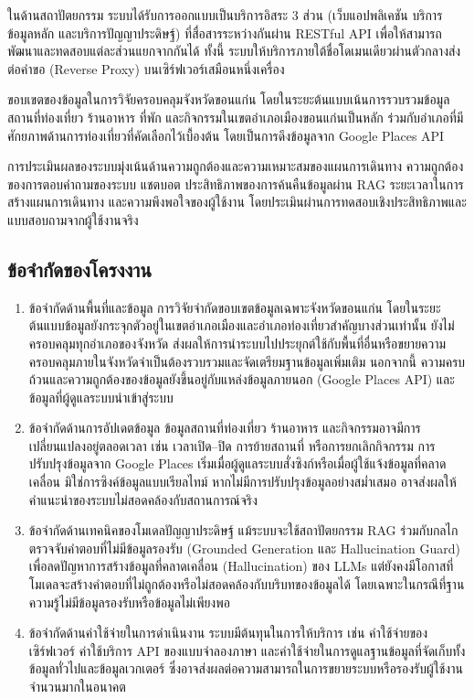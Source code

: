 ในด้านสถาปัตยกรรม ระบบได้รับการออกแบบเป็นบริการอิสระ 3 ส่วน (เว็บแอปพลิเคชัน บริการข้อมูลหลัก และบริการปัญญาประดิษฐ์) ที่สื่อสารระหว่างกันผ่าน RESTful API เพื่อให้สามารถพัฒนาและทดสอบแต่ละส่วนแยกจากกันได้ ทั้งนี้ ระบบให้บริการภายใต้ชื่อโดเมนเดียวผ่านตัวกลางส่งต่อคำขอ (Reverse Proxy) บนเซิร์ฟเวอร์เสมือนหนึ่งเครื่อง

ขอบเขตของข้อมูลในการวิจัยครอบคลุมจังหวัดขอนแก่น โดยในระยะต้นแบบเน้นการรวบรวมข้อมูลสถานที่ท่องเที่ยว ร้านอาหาร ที่พัก และกิจกรรมในเขตอำเภอเมืองขอนแก่นเป็นหลัก ร่วมกับอำเภอที่มีศักยภาพด้านการท่องเที่ยวที่คัดเลือกไว้เบื้องต้น โดยเป็นการดึงข้อมูลจาก Google Places API

การประเมินผลของระบบมุ่งเน้นด้านความถูกต้องและความเหมาะสมของแผนการเดินทาง ความถูกต้องของการตอบคำถามของระบบ แชตบอต ประสิทธิภาพของการค้นคืนข้อมูลผ่าน RAG ระยะเวลาในการสร้างแผนการเดินทาง และความพึงพอใจของผู้ใช้งาน โดยประเมินผ่านการทดสอบเชิงประสิทธิภาพและแบบสอบถามจากผู้ใช้งานจริง

\subsection{ข้อจำกัดของโครงงาน}

\begin{enumerate}[label=(\arabic*),leftmargin=0pt,itemindent=\dimexpr\parindent+\parenlabelwidth+1em\relax,align=right,labelwidth=\parenlabelwidth,labelsep=1em]
\item ข้อจำกัดด้านพื้นที่และข้อมูล การวิจัยจำกัดขอบเขตข้อมูลเฉพาะจังหวัดขอนแก่น โดยในระยะต้นแบบข้อมูลยังกระจุกตัวอยู่ในเขตอำเภอเมืองและอำเภอท่องเที่ยวสำคัญบางส่วนเท่านั้น ยังไม่ครอบคลุมทุกอำเภอของจังหวัด ส่งผลให้การนำระบบไปประยุกต์ใช้กับพื้นที่อื่นหรือขยายความครอบคลุมภายในจังหวัดจำเป็นต้องรวบรวมและจัดเตรียมฐานข้อมูลเพิ่มเติม นอกจากนี้ ความครบถ้วนและความถูกต้องของข้อมูลยังขึ้นอยู่กับแหล่งข้อมูลภายนอก (Google Places API) และข้อมูลที่ผู้ดูแลระบบนำเข้าสู่ระบบ
\item ข้อจำกัดด้านการอัปเดตข้อมูล ข้อมูลสถานที่ท่องเที่ยว ร้านอาหาร และกิจกรรมอาจมีการเปลี่ยนแปลงอยู่ตลอดเวลา เช่น เวลาเปิด--ปิด การย้ายสถานที่ หรือการยกเลิกกิจกรรม การปรับปรุงข้อมูลจาก Google Places เริ่มเมื่อผู้ดูแลระบบสั่งซิงก์หรือเมื่อผู้ใช้แจ้งข้อมูลที่คลาดเคลื่อน มิใช่การซิงค์ข้อมูลแบบเรียลไทม์ หากไม่มีการปรับปรุงข้อมูลอย่างสม่ำเสมอ อาจส่งผลให้คำแนะนำของระบบไม่สอดคล้องกับสถานการณ์จริง
\item ข้อจำกัดด้านเทคนิคของโมเดลปัญญาประดิษฐ์ แม้ระบบจะใช้สถาปัตยกรรม RAG ร่วมกับกลไกตรวจจับคำตอบที่ไม่มีข้อมูลรองรับ (Grounded Generation และ Hallucination Guard) เพื่อลดปัญหาการสร้างข้อมูลที่คลาดเคลื่อน (Hallucination) ของ LLMs แต่ยังคงมีโอกาสที่โมเดลจะสร้างคำตอบที่ไม่ถูกต้องหรือไม่สอดคล้องกับบริบทของข้อมูลได้ โดยเฉพาะในกรณีที่ฐานความรู้ไม่มีข้อมูลรองรับหรือข้อมูลไม่เพียงพอ
\item ข้อจำกัดด้านค่าใช้จ่ายในการดำเนินงาน ระบบมีต้นทุนในการให้บริการ เช่น ค่าใช้จ่ายของเซิร์ฟเวอร์ ค่าใช้บริการ API ของแบบจำลองภาษา และค่าใช้จ่ายในการดูแลฐานข้อมูลที่จัดเก็บทั้งข้อมูลทั่วไปและข้อมูลเวกเตอร์ ซึ่งอาจส่งผลต่อความสามารถในการขยายระบบหรือรองรับผู้ใช้งานจำนวนมากในอนาคต
\end{enumerate}

